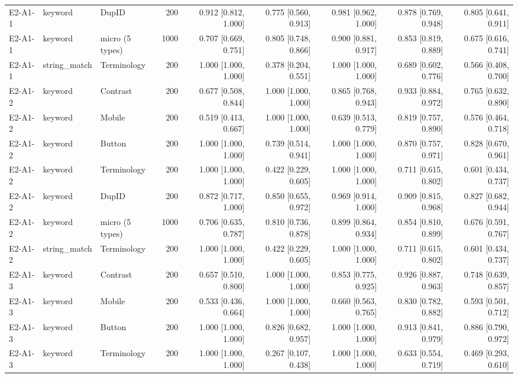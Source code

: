 \begin{table}[t]
\begin{tabular}{lllrrrrrr}
E2-A1-1 & keyword & DupID & 200 & 0.912 [0.812, 1.000] & 0.775 [0.560, 0.913] & 0.981 [0.962, 1.000] & 0.878 [0.769, 0.948] & 0.805 [0.641, 0.911] \\
E2-A1-1 & keyword & micro (5 types) & 1000 & 0.707 [0.669, 0.751] & 0.805 [0.748, 0.866] & 0.900 [0.881, 0.917] & 0.853 [0.819, 0.889] & 0.675 [0.616, 0.741] \\
E2-A1-1 & string\_match & Terminology & 200 & 1.000 [1.000, 1.000] & 0.378 [0.204, 0.551] & 1.000 [1.000, 1.000] & 0.689 [0.602, 0.776] & 0.566 [0.408, 0.700] \\
E2-A1-2 & keyword & Contrast & 200 & 0.677 [0.508, 0.844] & 1.000 [1.000, 1.000] & 0.865 [0.768, 0.943] & 0.933 [0.884, 0.972] & 0.765 [0.632, 0.890] \\
E2-A1-2 & keyword & Mobile & 200 & 0.519 [0.413, 0.667] & 1.000 [1.000, 1.000] & 0.639 [0.513, 0.779] & 0.819 [0.757, 0.890] & 0.576 [0.464, 0.718] \\
E2-A1-2 & keyword & Button & 200 & 1.000 [1.000, 1.000] & 0.739 [0.514, 0.941] & 1.000 [1.000, 1.000] & 0.870 [0.757, 0.971] & 0.828 [0.670, 0.961] \\
E2-A1-2 & keyword & Terminology & 200 & 1.000 [1.000, 1.000] & 0.422 [0.229, 0.605] & 1.000 [1.000, 1.000] & 0.711 [0.615, 0.802] & 0.601 [0.434, 0.737] \\
E2-A1-2 & keyword & DupID & 200 & 0.872 [0.717, 1.000] & 0.850 [0.655, 0.972] & 0.969 [0.914, 1.000] & 0.909 [0.815, 0.968] & 0.827 [0.682, 0.944] \\
E2-A1-2 & keyword & micro (5 types) & 1000 & 0.706 [0.635, 0.787] & 0.810 [0.736, 0.878] & 0.899 [0.864, 0.934] & 0.854 [0.810, 0.899] & 0.676 [0.591, 0.767] \\
E2-A1-2 & string\_match & Terminology & 200 & 1.000 [1.000, 1.000] & 0.422 [0.229, 0.605] & 1.000 [1.000, 1.000] & 0.711 [0.615, 0.802] & 0.601 [0.434, 0.737] \\
E2-A1-3 & keyword & Contrast & 200 & 0.657 [0.510, 0.800] & 1.000 [1.000, 1.000] & 0.853 [0.775, 0.925] & 0.926 [0.887, 0.963] & 0.748 [0.639, 0.857] \\
E2-A1-3 & keyword & Mobile & 200 & 0.533 [0.436, 0.664] & 1.000 [1.000, 1.000] & 0.660 [0.563, 0.765] & 0.830 [0.782, 0.882] & 0.593 [0.501, 0.712] \\
E2-A1-3 & keyword & Button & 200 & 1.000 [1.000, 1.000] & 0.826 [0.682, 0.957] & 1.000 [1.000, 1.000] & 0.913 [0.841, 0.979] & 0.886 [0.790, 0.972] \\
E2-A1-3 & keyword & Terminology & 200 & 1.000 [1.000, 1.000] & 0.267 [0.107, 0.438] & 1.000 [1.000, 1.000] & 0.633 [0.554, 0.719] & 0.469 [0.293, 0.610] \\

\end{tabular}
\end{table}
